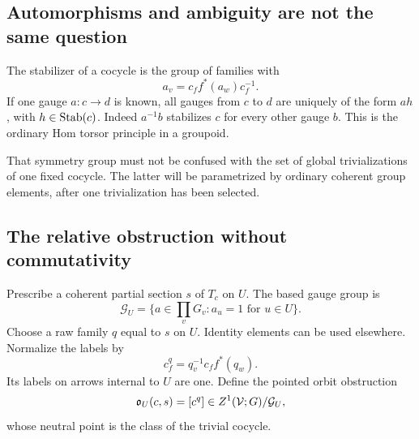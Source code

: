 \subsection{Automorphisms and ambiguity are not the same question}
The stabilizer of a cocycle is the group of families with
\[
 a_v=c_f f^*(a_w)c_f^{-1}.
\]
If one gauge \(a:c\to d\) is known, all gauges from \(c\) to \(d\) are uniquely of the form \(ah\), with \(h\in\operatorname{Stab}(c)\). Indeed \(a^{-1}b\) stabilizes \(c\) for every other gauge \(b\). This is the ordinary Hom torsor principle in a groupoid.

That symmetry group must not be confused with the set of global trivializations of one fixed cocycle. The latter will be parametrized by ordinary coherent group elements, after one trivialization has been selected.

\subsection{The relative obstruction without commutativity}
Prescribe a coherent partial section \(s\) of \(T_c\) on \(U\). The based gauge group is
\[
 \mathcal G_U=\{a\in\prod_vG_v:a_u=1\text{ for }u\in U\}.
\]
Choose a raw family \(q\) equal to \(s\) on \(U\). Identity elements can be used elsewhere. Normalize the labels by
\[
 c^q_f=q_v^{-1}c_f f^*(q_w).
\]
Its labels on arrows internal to \(U\) are one. Define the pointed orbit obstruction
\[
 \mathfrak o_U(c,s)=[c^q]\in Z^1(\mathcal V;G)/\mathcal G_U,
\]
whose neutral point is the class of the trivial cocycle.

